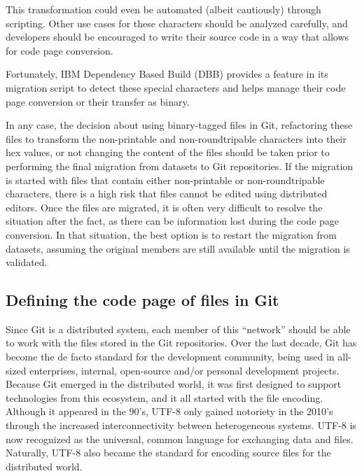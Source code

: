 \documentclass[
  letterpaper,
  DIV=11,
  numbers=noendperiod]{scrartcl}
\begin{document}
This transformation could even be automated (albeit cautiously) through
scripting. Other use cases for these characters should be analyzed
carefully, and developers should be encouraged to write their source
code in a way that allows for code page conversion.

Fortunately, IBM Dependency Based Build (DBB) provides a feature in its
migration script to detect these special characters and helps manage
their code page conversion or their transfer as binary.

In any case, the decision about using binary-tagged files in Git,
refactoring these files to transform the non-printable and
non-roundtripable characters into their hex values, or not changing the
content of the files should be taken prior to performing the final
migration from datasets to Git repositories. If the migration is started
with files that contain either non-printable or non-roundtripable
characters, there is a high risk that files cannot be edited using
distributed editors. Once the files are migrated, it is often very
difficult to resolve the situation after the fact, as there can be
information lost during the code page conversion. In that situation, the
best option is to restart the migration from datasets, assuming the
original members are still available until the migration is validated.

\hypertarget{defining-the-code-page-of-files-in-git}{%
\subsection{Defining the code page of files in
Git}\label{defining-the-code-page-of-files-in-git}}

Since Git is a distributed system, each member of this ``network''
should be able to work with the files stored in the Git repositories.
Over the last decade, Git has become the de facto standard for the
development community, being used in all-sized enterprises, internal,
open-source and/or personal development projects. Because Git emerged in
the distributed world, it was first designed to support technologies
from this ecosystem, and it all started with the file encoding. Although
it appeared in the 90's, UTF-8 only gained notoriety in the 2010's
through the increased interconnectivity between heterogeneous systems.
UTF-8 is now recognized as the universal, common language for exchanging
data and files. Naturally, UTF-8 also became the standard for encoding
source files for the distributed world.
\end{document}
